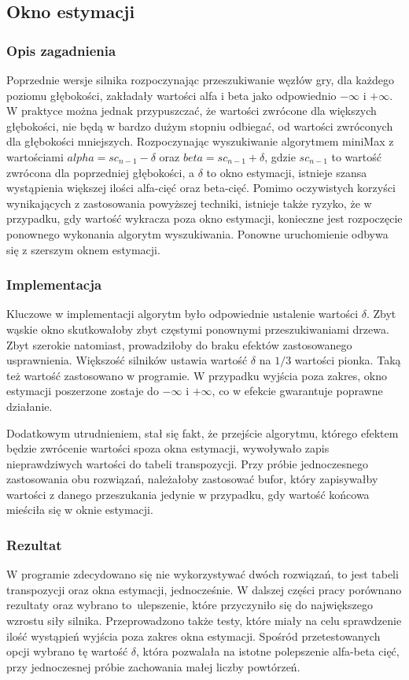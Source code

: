 \subsection{Okno estymacji}
\label{subsec:okno-estymacji}

\subsubsection{Opis zagadnienia}
Poprzednie wersje silnika rozpoczynając przeszukiwanie węzłów gry, dla każdego poziomu głębokości, zakładały wartości alfa i beta jako odpowiednio $-\infty$ i $+\infty$.
W praktyce można jednak przypuszczać, że wartości zwrócone dla większych głębokości, nie będą w bardzo dużym stopniu odbiegać, od wartości zwróconych dla głębokości mniejszych.
Rozpoczynając wyszukiwanie algorytmem miniMax z wartościami $alpha = sc_{n-1} - \delta$ oraz $beta = sc_{n-1} + \delta$, gdzie $sc_{n-1}$ to wartość zwrócona dla poprzedniej głębokości, a $\delta$ to okno estymacji, istnieje szansa wystąpienia większej ilości alfa-cięć oraz beta-cięć.
Pomimo oczywistych korzyści wynikających z zastosowania powyższej techniki, istnieje także ryzyko, że w przypadku, gdy wartość wykracza poza okno estymacji, konieczne jest rozpoczęcie ponownego wykonania algorytm wyszukiwania.
Ponowne uruchomienie odbywa się z szerszym oknem estymacji.

\subsubsection{Implementacja}
Kluczowe w implementacji algorytm było odpowiednie ustalenie wartości $\delta$.
Zbyt wąskie okno skutkowałoby zbyt częstymi ponownymi przeszukiwaniami drzewa.
Zbyt szerokie natomiast, prowadziłoby do braku efektów zastosowanego usprawnienia.
Większość silników ustawia wartość $\delta$ na $1/3$ wartości pionka. \cite*{duch}
Taką też wartość zastosowano w programie.
W przypadku wyjścia poza zakres, okno estymacji poszerzone zostaje do $-\infty$ i $+\infty$, co w efekcie gwarantuje poprawne działanie.

Dodatkowym utrudnieniem, stał się fakt, że przejście algorytmu, którego efektem będzie zwrócenie wartości spoza okna estymacji, wywoływało zapis nieprawdziwych wartości do tabeli transpozycji.
Przy próbie jednoczesnego zastosowania obu rozwiązań, należałoby zastosować bufor, który zapisywałby wartości z danego przeszukania jedynie w przypadku, gdy wartość końcowa mieściła się w oknie estymacji.

\subsubsection{Rezultat}
W programie zdecydowano się nie wykorzystywać dwóch rozwiązań, to jest tabeli transpozycji oraz okna estymacji, jednocześnie.
W dalszej części pracy porównano rezultaty oraz wybrano to~ulepszenie, które przyczyniło się do największego wzrostu siły silnika.
Przeprowadzono także testy, które miały na celu sprawdzenie ilość wystąpień wyjścia poza zakres okna estymacji.
Spośród przetestowanych opcji wybrano tę wartość $\delta$, która pozwalała na istotne polepszenie alfa-beta cięć, przy jednoczesnej próbie zachowania małej liczby powtórzeń.